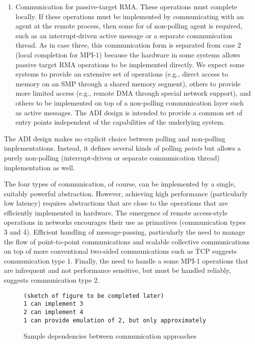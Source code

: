 \documentclass{article}
\begin{document}
\begin{enumerate}
\item Communication for passive-target RMA.  These operations
must complete locally.  If these operations must be implemented by
communicating with an agent at the remote process, then some for of
non-polling agent is required, such as an interrupt-driven active
message or a separate communication thread.  As in case three, this
communication form is separated from case 2 (local completion for
MPI-1) because the hardware in some systems allows passive target RMA
operations to be implemented directly.  We expect some systems to
provide an extensive set of operations (e.g., direct access to memory
on an SMP through a shared memory segment), others to provide more
limited access (e.g., remote DMA through special network support), and
others to be implemented on top of a non-polling communication layer
such as active messages.  The ADI design is intended to provide a
common set of entry points independent of the capabilities of the
underlying system.

\end{enumerate}

The ADI design makes no explicit choice between polling and
non-polling implementations.  Instead, it defines several kinds of
polling \emph{points} but allows a purely non-polling
(interrupt-driven or separate communication thread) implementation as well.

The four types of communication, of course, can be implemented by a
single, suitably powerful abstraction.  However, achieving high
performance (particularly low latency) requires abstractions that are
close to the operations that are efficiently implemented in hardware.
The emergence of remote access-style operations in networks
\cite{unet,via,infiniband} encourages their use as primatives
(communication types 3 and 4).  Efficient handling of message-passing,
particularly the need to manage the flow of point-to-point
communications and scalable collective communications on top of more
conventional two-sided communications such as TCP suggests
communication type 1.  Finally, the need to handle a some MPI-1
operations that are infrequent and not performance sensitive, but must
be handled reliably, suggests communication type 2.  

\begin{figure}
\begin{verbatim}
(sketch of figure to be completed later)
1 can implement 3
2 can implement 4
1 can provide emulation of 2, but only approximately
\end{verbatim}
\caption{Sample dependencies between communication approaches}
\label{fig:comm-depend}
\end{figure}
\end{document}

